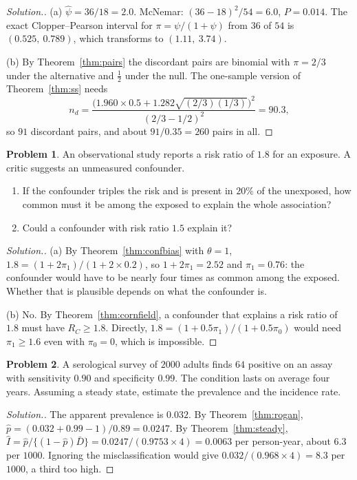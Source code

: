 \documentclass[11pt,a4paper]{article}
\numberwithin{equation}{section}
\theoremstyle{definition}
\newtheorem{problemx}{Problem}[subsection]
\newenvironment{problem}{\begin{problemx}}{\end{problemx}}
\newenvironment{solution}
  {\renewcommand{\qedsymbol}{}\begin{proof}[\textit{Solution}.]}
  {\end{proof}}
\begin{document}
\begin{solution}
(a) $\hat\psi = 36/18 = 2.0$. McNemar: $(36 - 18)^2/54 = 6.0$, $P = 0.014$. The exact Clopper--Pearson interval for $\pi = \psi/(1 + \psi)$ from $36$ of $54$ is $(0.525,\ 0.789)$, which
transforms to $(1.11,\ 3.74)$.

(b) By Theorem~\ref{thm:pairs} the discordant pairs are binomial with $\pi = 2/3$ under the alternative and $\tfrac12$ under the null. The one-sample version of
Theorem~\ref{thm:ss} needs
\[
n_d = \frac{\bigl(1.960 \times 0.5 + 1.282\sqrt{(2/3)(1/3)}\bigr)^2}{(2/3 - 1/2)^2} = 90.3 ,
\]
so $91$ discordant pairs, and about $91/0.35 = 260$ pairs in all.
\end{solution}

\begin{problem}
An observational study reports a risk ratio of $1.8$ for an exposure. A critic suggests an unmeasured confounder.
\begin{enumerate}[label=(\alph*)]
\item If the confounder triples the risk and is present in $20\%$ of the unexposed, how common must it be among the exposed to explain the
whole association?
\item Could a confounder with risk ratio $1.5$ explain it?
\end{enumerate}
\end{problem}

\begin{solution}
(a) By Theorem~\ref{thm:confbias} with $\theta = 1$, $1.8 = (1 + 2\pi_1)/(1 + 2 \times 0.2)$, so $1 + 2\pi_1 = 2.52$ and $\pi_1 = 0.76$: the confounder would have to be nearly four times as
common among the exposed. Whether that is plausible depends on what the confounder is.

(b) No. By Theorem~\ref{thm:cornfield}, a confounder that explains a risk ratio of $1.8$ must have $R_C \geq 1.8$. Directly, $1.8 = (1 + 0.5\pi_1)/(1 + 0.5\pi_0)$ would need
$\pi_1 \geq 1.6$ even with $\pi_0 = 0$, which is impossible.
\end{solution}

\begin{problem}
A serological survey of $2000$ adults finds $64$ positive on an assay with sensitivity $0.90$ and specificity $0.99$. The condition lasts on average
four years. Assuming a steady state, estimate the prevalence and the incidence rate.
\end{problem}

\begin{solution}
The apparent prevalence is $0.032$. By Theorem~\ref{thm:rogan}, $\hat p = (0.032 + 0.99 - 1)/0.89 = 0.0247$. By Theorem~\ref{thm:steady},
$\hat I = \hat p/\{(1 - \hat p)\bar D\} = 0.0247/(0.9753 \times 4) = 0.0063$ per person-year, about $6.3$ per $1000$. Ignoring the misclassification would give $0.032/(0.968 \times 4) = 8.3$ per
$1000$, a third too high.
\end{solution}
\end{document}
